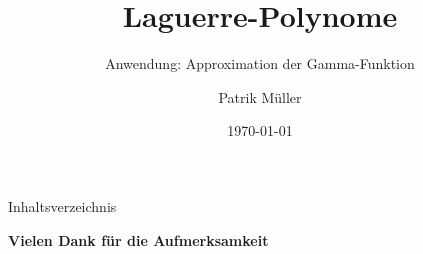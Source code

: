 \documentclass[ngerman, aspectratio=169, xcolor={rgb}]{beamer}
\title{Laguerre-Polynome}
\subtitle{Anwendung: Approximation der Gamma-Funktion}
\author{Patrik Müller}
\date{\today}
\begin{document}
\begin{frame}
	\titlepage
\end{frame}

\begin{frame}{Inhaltsverzeichnis}
	\tableofcontents
\end{frame}









\appendix
\begin{frame}
	\centering
	\Large
	\textbf{Vielen Dank für die Aufmerksamkeit}
\end{frame}
\end{document}
